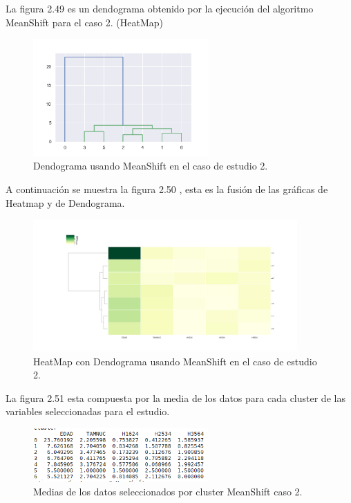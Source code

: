 
	La figura 2.49 es un dendograma obtenido por la ejecución del algoritmo MeanShift para
	el caso 2. (HeatMap) \\

	\begin{figure}[htb]
		\centering
		\includegraphics[width=0.6\textwidth]{./imagenes/caso2/dendograma_caso2_MeanShift}
		\caption{Dendograma usando MeanShift en el caso de estudio 2.} \label{fig:1}
	\end{figure}

	A continuación se muestra la figura 2.50 , esta es la fusión de las gráficas de 
	Heatmap y de Dendograma.  \\

	\begin{figure}[htb]
		\centering
		\includegraphics[width=0.9\textwidth]{./imagenes/caso2/heatmapcondendograma_caso2_MeanShift}
		\caption{HeatMap con Dendograma usando MeanShift en el caso de estudio 2.} \label{fig:1}
	\end{figure}

	La figura 2.51 esta compuesta por la media de los datos para cada cluster de las variables seleccionadas
	para el estudio. \\ 

	\begin{figure}[htb]
		\centering
		\includegraphics[width=0.6\textwidth]{./imagenes/caso2/medias_datos_caso2_MeanShift}
		\caption{Medias de los datos seleccionados por cluster MeanShift caso 2.} \label{fig:1}
	\end{figure}


